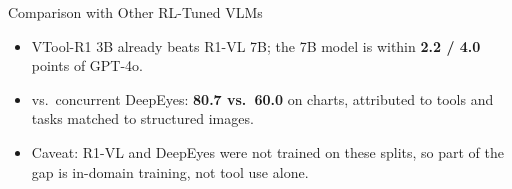 \documentclass[aspectratio=169]{beamer}
\begin{document}
\begin{frame}{Comparison with Other RL-Tuned VLMs}
  \begin{center}
  \end{center}
  \vspace{0.2cm}
  \begin{itemize}\small
    \item VTool-R1 3B already beats R1-VL 7B; the 7B model is within \textbf{2.2 / 4.0} points of GPT-4o.
    \item vs.\ concurrent DeepEyes: \textcolor{medgreen}{\textbf{80.7 vs.\ 60.0}} on charts, attributed to tools
          and tasks matched to structured images.
    \item \textcolor{alertred}{Caveat:} R1-VL and DeepEyes were not trained on these splits, so part of the gap
          is in-domain training, not tool use alone.
  \end{itemize}
\end{frame}
\end{document}
